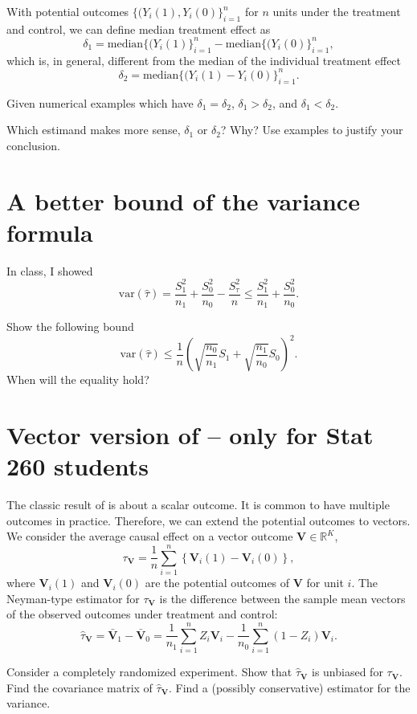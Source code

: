 \documentclass[11pt]{article}
\theoremstyle{definition}
\def\var{\text{var}}
\def\sumn{\sum_{i=1}^n}
\begin{document}
With potential outcomes $\{  (Y_i(1), Y_i(0) \}_{i=1}^n$ for $n$ units under the treatment and control, we can define median treatment effect as
$$
\delta_1 = \text{median}\{  (Y_i(1) \}_{i=1}^n - \text{median}\{  (Y_i(0) \}_{i=1}^n,
$$
which is, in general, different from the median of the individual treatment effect
$$
\delta_2 = \text{median}\{  (Y_i(1) - Y_i(0) \}_{i=1}^n .
$$


Given numerical examples which have $\delta_1 = \delta_2$, $\delta_1 > \delta_2$, and $\delta_1 < \delta_2.$

Which estimand makes more sense, $\delta_1$ or $\delta_2$? Why? Use examples to justify your conclusion. 



\section{A better bound of the variance formula}

In class, I showed
$$
\var(\widehat{\tau}) = \frac{S_1^2}{n_1} + \frac{S_0^2}{n_0} - \frac{S_\tau^2}{n} \leq \frac{S_1^2}{n_1} + \frac{S_0^2}{n_0}.
$$

Show the following bound
$$
\var(\widehat{\tau})  \leq   \frac{1}{n} \left(  \sqrt{  \frac{n_0}{n_1}  } S_1 +  \sqrt{  \frac{n_1}{n_0}  } S_0   \right)^2.
$$
When will the equality hold? 

 


\section{Vector version of \citet{Neyman:1923} -- only for Stat 260 students}

The classic result of \citet{Neyman:1923} is about a scalar outcome. It is common to have multiple outcomes in practice. Therefore, we can extend the potential outcomes to vectors. 
We consider the average causal effect on a vector outcome $\bm{V}  \in \mathbb{R}^K$, 
$$
\tau_{\bm{V}} = \frac{1}{n}  \sumn \left\{  \bm{V}_i(1) - \bm{V}_i(0) \right\},
$$
where $\bm{V}_i(1)$ and $\bm{V}_i(0)$ are the potential outcomes of $\bm{V}$ for unit $i$. 
The Neyman-type estimator for $\tau_{\bm{V}}$ is the difference between the sample mean vectors of the observed outcomes under treatment and control:
$$
\widehat{ \tau}_{\bm{V}} = \bar{\bm{V}}_1  - \bar{\bm{V}}_0 
= \frac{1}{n_1}   \sumn Z_i  \bm{V}_i   - \frac{1}{n_0}  \sumn (1-Z_i) \bm{V}_i . 
$$


Consider a completely randomized experiment.
Show that $\widehat{ \tau}_{\bm{V}} $ is unbiased for $\tau_{\bm{V}} $. Find the covariance matrix of $\widehat{ \tau}_{\bm{V}} $. Find a (possibly conservative) estimator for the variance. 
 



\end{document}
